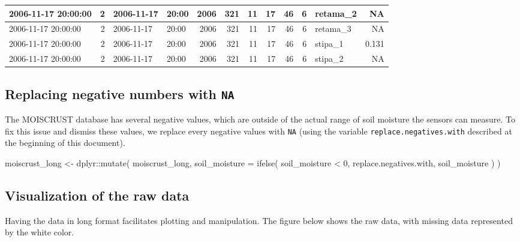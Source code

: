 \documentclass[
  table]{article}
\newenvironment{Shaded}{\begin{snugshade}}{\end{snugshade}}
\newcommand{\AttributeTok}[1]{\textcolor[rgb]{0.77,0.63,0.00}{#1}}
\newcommand{\DecValTok}[1]{\textcolor[rgb]{0.00,0.00,0.81}{#1}}
\newcommand{\FunctionTok}[1]{\textcolor[rgb]{0.00,0.00,0.00}{#1}}
\newcommand{\NormalTok}[1]{#1}
\newcommand{\OtherTok}[1]{\textcolor[rgb]{0.56,0.35,0.01}{#1}}
\newcommand{\SpecialCharTok}[1]{\textcolor[rgb]{0.00,0.00,0.00}{#1}}
\begin{document}
\begin{table}[H]
{\begin{tabular}[t]{l|r|l|l|r|r|r|r|r|r|l|r}
\hline
2006-11-17 20:00:00 & 2 & 2006-11-17 & 20:00 & 2006 & 321 & 11 & 17 & 46 & 6 & retama\_2 & NA\\
\hline
2006-11-17 20:00:00 & 2 & 2006-11-17 & 20:00 & 2006 & 321 & 11 & 17 & 46 & 6 & retama\_3 & NA\\
\hline
2006-11-17 20:00:00 & 2 & 2006-11-17 & 20:00 & 2006 & 321 & 11 & 17 & 46 & 6 & stipa\_1 & 0.131\\
\hline
2006-11-17 20:00:00 & 2 & 2006-11-17 & 20:00 & 2006 & 321 & 11 & 17 & 46 & 6 & stipa\_2 & NA\\
\hline
\end{tabular}}
\end{table}

\hypertarget{replacing-negative-numbers-with-na}{%
\subsection{\texorpdfstring{Replacing negative numbers with
\texttt{NA}}{Replacing negative numbers with NA}}\label{replacing-negative-numbers-with-na}}

The MOISCRUST database has several negative values, which are outside of
the actual range of soil moisture the sensors can measure. To fix this
issue and dismiss these values, we replace every negative values with
\texttt{NA} (using the variable \texttt{replace.negatives.with}
described at the beginning of this document).

\begin{Shaded}
\begin{Highlighting}[]
\NormalTok{moiscrust\_long }\OtherTok{\textless{}{-}}\NormalTok{ dplyr}\SpecialCharTok{::}\FunctionTok{mutate}\NormalTok{(}
\NormalTok{  moiscrust\_long,}
  \AttributeTok{soil\_moisture =} \FunctionTok{ifelse}\NormalTok{(}
\NormalTok{    soil\_moisture }\SpecialCharTok{\textless{}} \DecValTok{0}\NormalTok{,}
\NormalTok{    replace.negatives.with,}
\NormalTok{    soil\_moisture}
\NormalTok{  )}
\NormalTok{)}
\end{Highlighting}
\end{Shaded}

\hypertarget{visualization-of-the-raw-data}{%
\subsection{Visualization of the raw
data}\label{visualization-of-the-raw-data}}

Having the data in long format facilitates plotting and manipulation.
The figure below shows the raw data, with missing data represented by
the white color.
\end{document}
